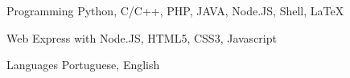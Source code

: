 

\begin{cvskills}

  \cvskill
    {Programming} %
    {Python, C/C++, PHP, JAVA, Node.JS, Shell, LaTeX} %

  \cvskill
    {Web} %
    {Express with Node.JS, HTML5, CSS3, Javascript} %

  \cvskill
    {Languages} %
    {Portuguese, English} %

\end{cvskills}
